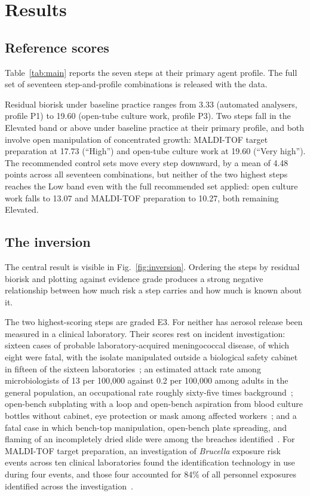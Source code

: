 \section{Results}

\subsection{Reference scores}

Table~\ref{tab:main} reports the seven steps at their primary agent profile. The full set
of seventeen step-and-profile combinations is released with the data.

Residual biorisk under baseline practice ranges from 3.33 (automated analysers, profile
P1) to 19.60 (open-tube culture work, profile P3). Two steps fall in the Elevated band or
above under baseline practice at their primary profile, and both involve open manipulation
of concentrated growth: MALDI-TOF target preparation at 17.73 (``High'') and open-tube
culture work at 19.60 (``Very high''). The recommended control sets move every step
downward, by a mean of 4.48 points across all seventeen combinations, but neither of the
two highest steps reaches the Low band even with the full recommended set applied: open
culture work falls to 13.07 and MALDI-TOF preparation to 10.27, both remaining Elevated.

\subsection{The inversion}
\label{sec:inversion}

The central result is visible in Fig.~\ref{fig:inversion}. Ordering the steps by residual
biorisk and plotting against evidence grade produces a strong negative relationship
between how much risk a step carries and how much is known about it.

The two highest-scoring steps are graded E3. For neither has aerosol release been measured
in a clinical laboratory. Their scores rest on incident investigation: sixteen cases of
probable laboratory-acquired meningococcal disease, of which eight were fatal, with the
isolate manipulated outside a biological safety cabinet in fifteen of the sixteen
laboratories~\cite{sejvar2005}; an estimated attack rate among microbiologists of 13 per
100{,}000 against 0.2 per 100{,}000 among adults in the general population, an
occupational rate roughly sixty-five times background~\cite{sejvar2005}; open-bench
subplating with a loop and open-bench aspiration from blood culture bottles without
cabinet, eye protection or mask among affected workers~\cite{mmwr2002}; and a fatal case
in which bench-top manipulation, open-bench plate spreading, and flaming of an
incompletely dried slide were among the breaches identified~\cite{mmwr2014}. For
MALDI-TOF target preparation, an investigation of \emph{Brucella} exposure risk events
across ten clinical laboratories found the identification technology in use during four
events, and those four accounted for 84\% of all personnel exposures identified across the
investigation~\cite{ackelsberg2020}.

